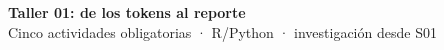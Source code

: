 \documentclass[11pt,a4paper]{report}
\begin{document}
\begin{center}{\LARGE\bfseries Taller 01: de los tokens al reporte}\\[3pt]
{\large Cinco actividades obligatorias · R/Python · investigación desde S01}\end{center}

\end{document}
